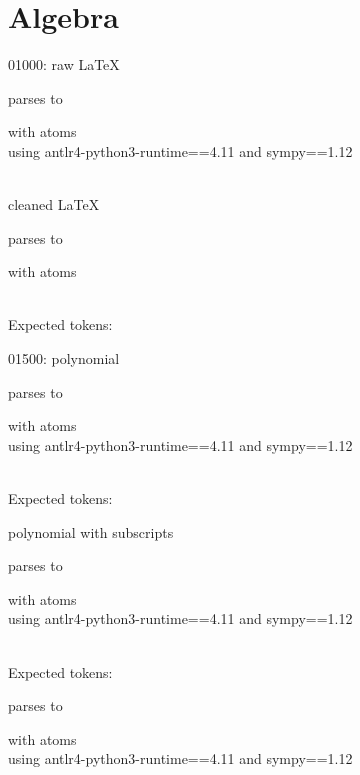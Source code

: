 \documentclass{article}
\begin{document}
\hrulefill

\section{Algebra}

\hrulefill

01000:
raw \LaTeX

parses to 

with atoms 
\\
using antlr4-python3-runtime==4.11 and sympy==1.12

\ \\
cleaned \LaTeX

parses to 

with atoms 


\ \\
Expected tokens: 


\hrulefill

01500:
polynomial
    
parses to

with atoms 
\\
using antlr4-python3-runtime==4.11 and sympy==1.12

\ \\
Expected tokens: 


\hrulefill

polynomial with subscripts
  
parses to

with atoms 
\\
using antlr4-python3-runtime==4.11 and sympy==1.12

\ \\
Expected tokens:



\hrulefill



parses to

with atoms 
\\
using antlr4-python3-runtime==4.11 and sympy==1.12
\end{document}

